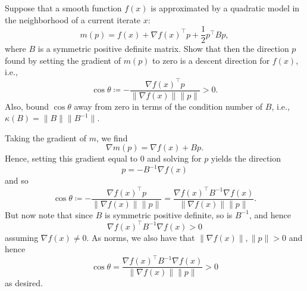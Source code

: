 \documentclass{../kin_math}
\begin{document}
\begin{questions}
  \question Suppose that a smooth function $f(x)$ is approximated by a quadratic model in the neighborhood of a current iterate $x$:
  \begin{equation*}
    m(p) = f(x) + \nabla f(x)^\top p + \frac{1}{2} p^\top B p,
  \end{equation*}
  where $B$ is a symmetric positive definite matrix. Show that then the direction $p$ found by setting the gradient of $m(p)$ to zero is a descent direction for $f(x)$, i.e.,
  \begin{equation*}
    \cos \theta \coloneqq - \frac{\nabla f(x)^\top p}{\lVert \nabla f(x) \rVert \lVert p \rVert} > 0.
  \end{equation*}
  Also, bound $\cos \theta$ away from zero in terms of the condition number of $B$, i.e., $\kappa(B) = \lVert B \rVert \lVert B^{-1} \rVert$.
  \begin{solution}
    Taking the gradient of $m$, we find
    \begin{equation*}
      \nabla m(p) = \nabla f(x) + B p.
    \end{equation*}
    Hence, setting this gradient equal to 0 and solving for $p$ yields the direction
    \begin{equation*}
      p = -B^{-1} \nabla f(x)
    \end{equation*}
    and so
    \begin{equation*}
      \cos \theta \coloneqq - \frac{\nabla f(x)^\top p}{\lVert \nabla f(x) \rVert \lVert p \rVert} = \frac{\nabla f(x)^\top B^{-1} \nabla f(x)}{\lVert \nabla f(x) \rVert \lVert p \rVert}.
    \end{equation*}
    But now note that since $B$ is symmetric positive definite, so is $B^{-1}$, and hence
    \begin{equation*}
      \nabla f(x)^\top B^{-1} \nabla f(x) > 0
    \end{equation*}
    assuming $\nabla f(x) \neq 0$. As norms, we also have that $\lVert \nabla f(x) \rVert, \lVert p \rVert > 0$ and hence
    \begin{equation*}
      \cos \theta = \frac{\nabla f(x)^\top B^{-1} \nabla f(x)}{\lVert \nabla f(x) \rVert \lVert p \rVert} > 0
    \end{equation*}
    as desired.


\end{solution}
\end{questions}
\end{document}
